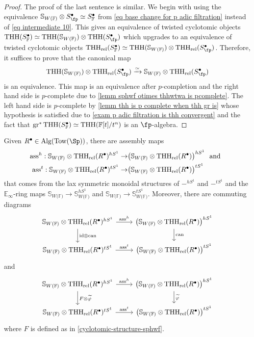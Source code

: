 \documentclass[english,10pt]{amsart}
\newcommand{\sphwf}{\mathbb{S}_{W(\mathbb{F)}}}
\newcommand{\rel}{\textup{rel}}
\newcommand{\field}{\mathbb{F}}
\theoremstyle{definition}
\numberwithin{equation}{section}
\DeclareMathOperator{\thh}{\ensuremath{\textup{THH}}}
\newcommand{\rthh}{\mathrm{THH}_{\rel}}
\newcommand{\Tow}{\mathrm{Tow}}
\newcommand{\Alg}{\mathrm{Alg}}
\newcommand{\gr}{\textup{gr}^*}
\begin{document}
\begin{proof}
The proof of the last sentence  is similar. We begin with using the equivalence $\sphwf \otimes S_{\fp}^{\bullet} 
\simeq S_{\field}^{\bullet}$ from \eqref{eq base change for p adic filtration} instead of \eqref{eq intermediate 10}. This gives an equivalence of twisted cyclotomic objects $\thh(S_{\field}^\bullet) \simeq \thh(\sphwf) \otimes \thh(S_{\fp}^\bullet)$ which upgrades to an equivalence of twisted cyclotomic objects $\rthh(S_{\field}^{\bullet}) \simeq \thh(\sphwf) \otimes \rthh(S_{\fp}^\bullet)$. Therefore, it suffices to prove that the canonical map 
\[\thh(\sphwf) \otimes \rthh(S_{\fp}^\bullet) \xrightarrow{\simeq} \sphwf \otimes \rthh(S_{\fp}^\bullet)\]
is an equivalence. This map is an equivalence after $p$-completion  and the right hand side is $p$-complete due to \autoref{lemm sphwf otimes thhwtwa is pcomplete}.  The left hand side is $p$-complete by \autoref{lemm thh is p complete when thh gr is} whose hypothesis is satisfied due to \autoref{exam p adic filtration is thh convergent} and the fact that $\gr \thh(S_{\field}^\bullet) \simeq \thh(\field[t]/t^n)$ is an $\fp$-algebra. 
\end{proof}


Given $R^{\bullet}\in \Alg(\Tow(\Sp))$, there are assembly maps 
\begin{equation}\label{eq moving witts out of fixed points}
\begin{split}
\textup{ass}^{h}  : \sphwf \otimes \rthh(R^{\bullet})^{hS^1} \to &\big(\sphwf \otimes \rthh(R^{\bullet})\big)^{hS^1} \textup{\ \ and \ } \\ 
\textup{ass}^{t}  : \sphwf \otimes \rthh(R^{\bullet})^{tS^1} \to &\big(\sphwf \otimes \rthh(R^{\bullet})\big)^{tS^1}
\end{split}
\end{equation}
that comes from the lax symmetric monoidal structures of $-^{hS^1}$ and $-^{tS^1}$ and the $\mathbb{E}_\infty$-ring maps $\sphwf \to \sphwf^{hS^1}$ and $\sphwf \to \sphwf^{tS^1}$. Moreover, there are commuting diagrams 
\[
\begin{tikzcd}
\sphwf \otimes \rthh(R^{\bullet})^{hS^1} \arrow[r,"\textup{ass}^{h}" ] \arrow[d,"\textup{id} \otimes \textup{can} " ] &  \big(\sphwf \otimes \rthh(R^{\bullet})\big)^{hS^1}  \arrow[d,"\textup{can}"]\\ 
\sphwf \otimes \rthh(R^{\bullet})^{tS^1} \arrow[r,"\textup{ass}^{t}" ] &  \big(\sphwf \otimes \rthh(R^{\bullet})\big)^{tS^1} 
\end{tikzcd}
\]
and 
\[
\begin{tikzcd}
\sphwf \otimes \rthh(R^{\bullet})^{hS^1} \arrow[r,"\textup{ass}^{h}" ] \arrow[d,"F \otimes \widetilde{\varphi} " ] &  \big(\sphwf \otimes \rthh(R^{\bullet})\big)^{hS^1}  \arrow[d,"\widetilde{\varphi}"]\\ 
\sphwf \otimes \rthh(R^{\bullet})^{tS^1} \arrow[r,"\textup{ass}^{t}" ] &  \big(\sphwf \otimes \rthh(R^{\bullet})\big)^{tS^1}  
\end{tikzcd}
\]
where $F$ is defined as in \autoref{cyclotomic-structure-sphwf}. 
\end{document}
